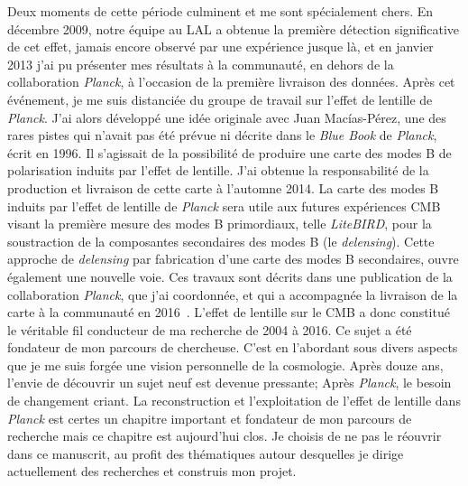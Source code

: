 \documentclass[a4paper, 12pt]{report}
\begin{document}
Deux moments de cette période culminent et me sont spécialement
chers. En décembre 2009, notre équipe au LAL a obtenue la première
détection significative de cet effet, jamais encore observé par une
expérience jusque là, et en janvier 2013 j'ai pu présenter mes
résultats à la communauté, en dehors de la collaboration \emph{Planck}, à
l'occasion de la première livraison des
données. Après cet événement, je me suis distanciée du groupe de
travail sur l'effet de lentille de \emph{Planck}. J'ai alors développé une idée
originale avec Juan Mac\'ias-P\'erez, une des
rares pistes qui n'avait pas été prévue ni décrite dans le
\emph{Blue Book} de \emph{Planck}, écrit en 1996. Il s'agissait de la
possibilité de produire une carte des modes B de polarisation induits par l'effet de
lentille. J'ai obtenue la responsabilité de la production et livraison
de cette carte à l'automne 2014. La carte des modes B induits par
l'effet de lentille de \emph{Planck} sera utile aux futures expériences CMB
visant la première mesure des modes B primordiaux, telle \emph{
  LiteBIRD}, pour la soustraction de la composantes secondaires des
modes B (le \emph{delensing}). Cette approche de \emph{delensing}
par fabrication d'une carte des modes B secondaires, ouvre également
une nouvelle voie. Ces travaux sont décrits dans une publication de la
collaboration \emph{Planck}, que j'ai coordonnée, et
qui a accompagnée la livraison de la carte à la communauté en
2016~\citep{Planck2016_Bmap}.
L'effet de lentille sur le CMB a donc constitué le véritable fil
conducteur de ma recherche de 2004 à 2016.
Ce sujet a été fondateur de mon parcours de chercheuse. C'est en
l'abordant sous divers aspects que je me suis forgée une vision
personnelle de la cosmologie. Après douze ans, l'envie de découvrir un
sujet neuf est devenue pressante; Après \emph{Planck}, le besoin de
changement criant. La reconstruction et l'exploitation de l'effet de
lentille dans \emph{Planck} est certes un chapitre important et fondateur de
mon parcours de recherche mais ce chapitre est aujourd'hui clos. Je
choisis de ne pas le réouvrir dans ce manuscrit, au profit des
thématiques autour desquelles je dirige actuellement des recherches et
construis mon projet.
\end{document}
